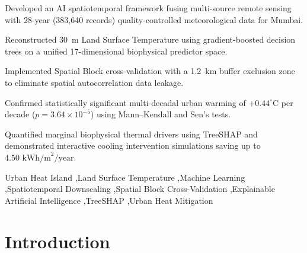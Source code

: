 \documentclass[a4paper,fleqn]{cas-sc}
\begin{document}
\begin{abstract}
evidence-based thermal mitigation in dense coastal environments across the Global South.
\end{abstract}

\begin{highlights}
\item Developed an AI spatiotemporal framework fusing multi-source remote sensing with 28-year (383,640 records) quality-controlled meteorological data for Mumbai.
\item Reconstructed 30~m Land Surface Temperature using gradient-boosted decision trees on a unified 17-dimensional biophysical predictor space.
\item Implemented Spatial Block cross-validation with a 1.2~km buffer exclusion zone to eliminate spatial autocorrelation data leakage.
\item Confirmed statistically significant multi-decadal urban warming of $+0.44^\circ\text{C}$ per decade ($p = 3.64 \times 10^{-5}$) using Mann--Kendall and Sen's tests.
\item Quantified marginal biophysical thermal drivers using TreeSHAP and demonstrated interactive cooling intervention simulations saving up to $4.50\text{ kWh/m}^2/\text{year}$.
\end{highlights}

\begin{keywords}
Urban Heat Island \sep Land Surface Temperature \sep Machine Learning \sep Spatiotemporal Downscaling \sep Spatial Block Cross-Validation \sep Explainable Artificial Intelligence \sep TreeSHAP \sep Urban Heat Mitigation
\end{keywords}

\maketitle

\section{Introduction}
\label{sec:introduction}
\end{document}
